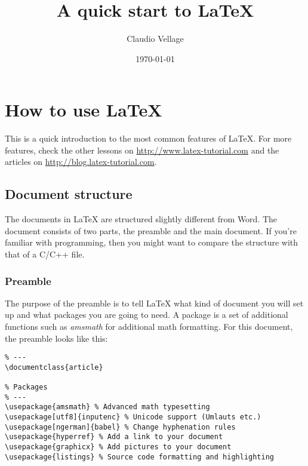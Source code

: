 \documentclass{article}
\begin{document}
\author{Claudio Vellage}
\title{A quick start to \LaTeX{}}
\date{\today{}} %

\maketitle{} %

\tableofcontents{} %


\maketitle
\newpage
\section{How to use \LaTeX{}}
This is a quick introduction to the most common features of \LaTeX{}. For more features, check the other lessons on \url{http://www.latex-tutorial.com} and the articles on \url{http://blog.latex-tutorial.com}. 
\subsection{Document structure}
The documents in \LaTeX{} are structured slightly different from Word. The document consists of two parts, the preamble and the main document. If you're familiar with programming, then you might want to compare the structure with that of a C/C++ file.

\subsubsection{Preamble}
The purpose of the preamble is to tell \LaTeX{} what kind of document you will set up and what packages you are going to need. A package is a set of additional functions such as \emph{amsmath} for additional math formatting. For this document, the preamble looks like this:

\begin{lstlisting}[language={[LaTeX]TeX},caption=Preamble of this document,breaklines=true,frame=single]
% Preamble
% ---
\documentclass{article}

% Packages
% ---
\usepackage{amsmath} % Advanced math typesetting
\usepackage[utf8]{inputenc} % Unicode support (Umlauts etc.)
\usepackage[ngerman]{babel} % Change hyphenation rules
\usepackage{hyperref} % Add a link to your document
\usepackage{graphicx} % Add pictures to your document
\usepackage{listings} % Source code formatting and highlighting
\end{lstlisting}
\end{document}
